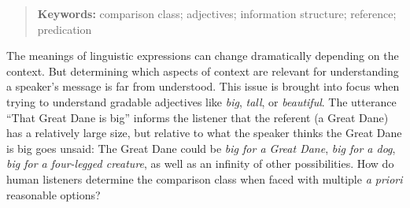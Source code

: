 \documentclass[10pt,letterpaper]{article}
\begin{document}
\begin{quote}
\small
\textbf{Keywords:} 
comparison class; adjectives; information structure; reference; predication
\end{quote}
The meanings of linguistic expressions can change dramatically depending on the context. 
But determining which aspects of context are relevant for understanding a speaker's message is far from understood.
This issue is brought into focus when trying to understand gradable adjectives like \emph{big}, \emph{tall}, or \emph{beautiful}.
The utterance ``That Great Dane is big'' informs the listener that the referent (a Great Dane) has a relatively large size, but relative to what the speaker thinks the Great Dane is big goes unsaid: The Great Dane could be \textit{big for a Great Dane},  \textit{big for a dog}, \textit{big for a four-legged creature}, as well as an infinity of other possibilities. 
How do human listeners determine the comparison class when faced with multiple \textit{a priori} reasonable options? 
\end{document}

